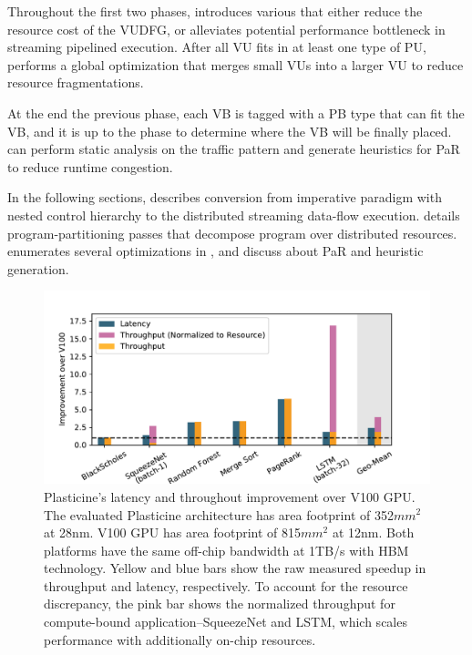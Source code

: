 Throughout the first two phases, \name introduces various  that either reduce the
resource cost of the VUDFG, or alleviates potential performance bottleneck in streaming pipelined execution.
After all VU fits in at least one type of PU, \name performs a global optimization that merges 
small VUs into a larger VU to reduce resource fragmentations.

At the end the previous phase, each VB is tagged with a PB type that can fit the VB, and it is up to the
 phase to determine where the VB will be finally placed.
\name can perform static analysis on the traffic pattern and generate heuristics for PaR to
reduce runtime congestion.

In the following sections,  describes conversion from imperative paradigm with
nested control hierarchy to the distributed streaming data-flow execution.
 details program-partitioning passes that decompose program over distributed resources.
 enumerates several optimizations in \name, and  discuss about PaR and
heuristic generation.

\begin{figure}
\centering
\includegraphics[width=1\textwidth]{figs/slide_gpu.pdf}
\caption[Performance comparison with V100 GPU]{
  Plasticine's latency and throughout improvement over V100 GPU.
  The evaluated Plasticine architecture has area footprint of 352$mm^2$ at 28nm.
  V100 GPU has area footprint of 815$mm^2$ at 12nm.
  Both platforms have the same off-chip bandwidth at 1TB/s with HBM technology.
  Yellow and blue bars show the raw measured speedup in throughput and latency, respectively.
  To account for the resource discrepancy, the pink bar shows the normalized throughput
  for compute-bound application--SqueezeNet and LSTM, which scales performance with additionally
  on-chip resources.
}
\label{fig:peakutil}
\end{figure}
